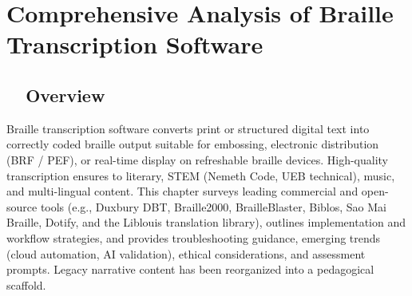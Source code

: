\chapter{Comprehensive Analysis of Braille Transcription Software}

\label{chap:braille-transcription-software}

\section{~~Overview}
\label{sec:braille-overview}
Braille transcription software converts print or structured digital text into correctly coded braille output suitable for embossing, electronic distribution (BRF / PEF), or real-time display on refreshable braille devices. High-quality transcription ensures  to literary, STEM (Nemeth Code, UEB technical), music, and multi-lingual content. This chapter surveys leading commercial and open-source tools (e.g., Duxbury DBT\supercite{Duxbury}, Braille2000\supercite{Braille2000}, BrailleBlaster\supercite{BrailleBlaster}, Biblos\supercite{Biblos}, Sao Mai Braille\supercite{SMB}, Dotify\supercite{Dotify}, and the Liblouis\supercite{Liblouis} translation library), outlines implementation and workflow strategies, and provides troubleshooting guidance, emerging trends (cloud automation, AI validation), ethical considerations, and assessment prompts. Legacy narrative content has been reorganized into a pedagogical scaffold.

